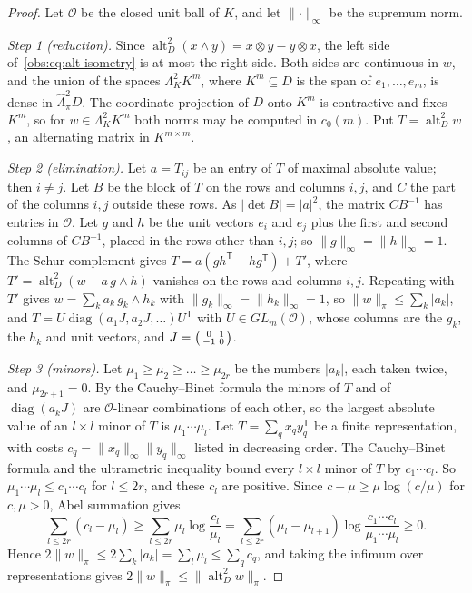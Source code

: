 \documentclass[11pt]{amsart}
\theoremstyle{definition}
\theoremstyle{remark}
\numberwithin{equation}{section}
\newcommand{\abs}[1]{\lvert #1\rvert}
\newcommand{\norm}[1]{\lVert #1\rVert}
\theoremstyle{plain}
\theoremstyle{definition}
\theoremstyle{plain}
\newcommand{\alt}{\operatorname{alt}}
\newcommand{\hLambda}{\widehat\Lambda}
\begin{document}
\begin{proof}
Let $\mathcal O$ be the closed unit ball of $K$, and let $\norm\cdot_\infty$ be the supremum norm.

\emph{Step 1 (reduction).} Since $\alt^2_D(x\wedge y)=x\otimes y-y\otimes x$, the left side
of~\eqref{obs:eq:alt-isometry} is at most the right side. Both sides are continuous in $w$, and the union of the spaces
$\Lambda^2_KK^m$, where $K^m\subseteq D$ is the span of $e_1,\dots,e_m$, is dense in $\hLambda^2_\pi D$. The coordinate
projection of $D$ onto $K^m$ is contractive and fixes $K^m$, so for $w\in\Lambda^2_KK^m$ both norms may be computed in
$c_0(m)$. Put $T=\alt^2_Dw$, an alternating matrix in $K^{m\times m}$.

\emph{Step 2 (elimination).} Let $a=T_{ij}$ be an entry of $T$ of maximal absolute value; then $i\ne j$. Let $B$ be the
block of $T$ on the rows and columns $i,j$, and $C$ the part of the columns $i,j$ outside these rows. As
$\abs{\det B}=\abs a^2$, the matrix $CB^{-1}$ has entries in $\mathcal O$. Let $g$ and $h$ be the unit vectors $e_i$
and $e_j$ plus the first and second columns of $CB^{-1}$, placed in the rows other than $i,j$; so
$\norm g_\infty=\norm h_\infty=1$. The Schur complement gives $T=a(gh^{\mathsf T}-hg^{\mathsf T})+T'$, where
$T'=\alt^2_D(w-a\,g\wedge h)$ vanishes on the rows and columns $i,j$. Repeating with $T'$ gives
$w=\sum_ka_k\,g_k\wedge h_k$ with $\norm{g_k}_\infty=\norm{h_k}_\infty=1$, so $\norm w_\pi\le\sum_k\abs{a_k}$, and
$T=U\operatorname{diag}(a_1J,a_2J,\dots)U^{\mathsf T}$ with $U\in GL_m(\mathcal O)$, whose columns are the
$g_k$, the $h_k$ and unit vectors, and $J=\begin{psmallmatrix}0&1\\-1&0\end{psmallmatrix}$.

\emph{Step 3 (minors).} Let $\mu_1\ge\mu_2\ge\dots\ge\mu_{2r}$ be the numbers $\abs{a_k}$, each taken twice, and
$\mu_{2r+1}=0$. By the Cauchy--Binet formula the minors of $T$ and of $\operatorname{diag}(a_kJ)$ are
$\mathcal O$-linear combinations of each other, so the largest absolute value of an $l\times l$ minor of $T$ is
$\mu_1\cdots\mu_l$. Let $T=\sum_qx_qy_q^{\mathsf T}$ be a finite representation, with costs
$c_q=\norm{x_q}_\infty\norm{y_q}_\infty$ listed in decreasing order. The Cauchy--Binet formula and the ultrametric
inequality bound every $l\times l$ minor of $T$ by $c_1\cdots c_l$. So $\mu_1\cdots\mu_l\le c_1\cdots c_l$ for
$l\le2r$, and these $c_l$ are positive. Since $c-\mu\ge\mu\log(c/\mu)$ for $c,\mu>0$, Abel summation gives
\[
 \sum_{l\le2r}(c_l-\mu_l)\ge\sum_{l\le2r}\mu_l\log\frac{c_l}{\mu_l}
 =\sum_{l\le2r}(\mu_l-\mu_{l+1})\log\frac{c_1\cdots c_l}{\mu_1\cdots\mu_l}\ge0 .
\]
Hence $2\norm w_\pi\le2\sum_k\abs{a_k}=\sum_l\mu_l\le\sum_qc_q$, and taking the infimum over representations gives
$2\norm w_\pi\le\norm{\alt^2_Dw}_\pi$.
\end{proof}
\end{document}
